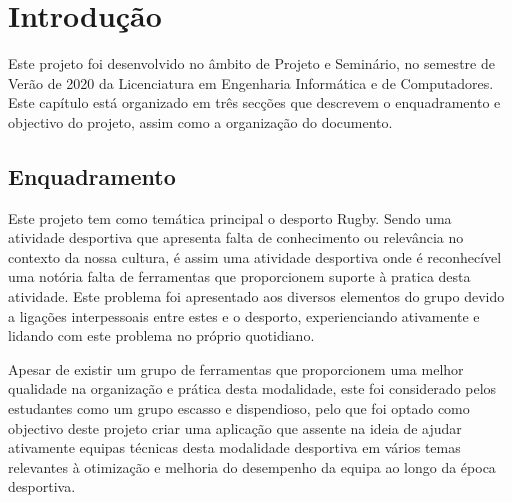%
%
%
\chapter{Introdução} \label{cap:intro}

Este projeto foi desenvolvido no âmbito de Projeto e Seminário, no semestre de Verão de 2020 da Licenciatura em Engenharia Informática e de Computadores. 
Este capítulo está organizado em três secções que descrevem o enquadramento e objectivo do projeto, assim como a organização do documento.


%
%
\section{Enquadramento\label{key}} \label{sec11}

%
Este projeto tem como temática principal o desporto Rugby. Sendo uma atividade desportiva que apresenta falta de conhecimento ou relevância no contexto da nossa cultura, é assim uma atividade desportiva onde é reconhecível uma notória falta de ferramentas que proporcionem suporte à pratica desta atividade. Este problema foi apresentado aos diversos elementos do grupo devido a ligações interpessoais entre estes e o desporto, experienciando ativamente e lidando com este problema no próprio quotidiano.

Apesar de existir um grupo de ferramentas que proporcionem uma melhor qualidade na organização e prática desta modalidade, este foi considerado pelos estudantes como um grupo escasso e dispendioso, pelo que foi optado como objectivo deste projeto criar uma aplicação que assente na ideia de ajudar ativamente equipas técnicas desta modalidade desportiva em vários temas relevantes à otimização e melhoria do desempenho da equipa ao longo da época desportiva.


